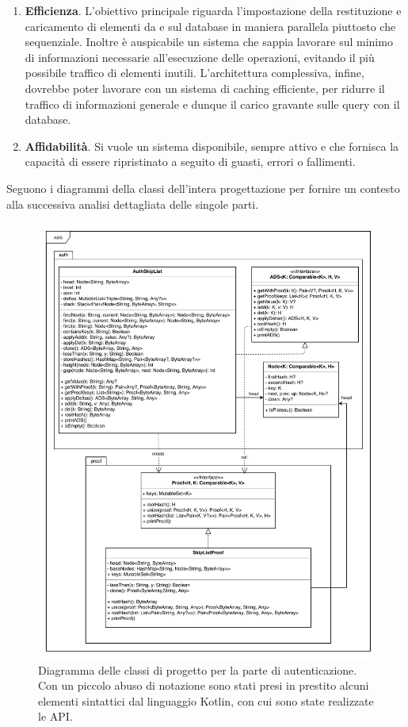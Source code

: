 	\begin{enumerate}
		\item \textbf{Efficienza}. L'obiettivo principale riguarda l'impostazione della restituzione e caricamento di elementi da e sul database in maniera parallela piuttosto che sequenziale. Inoltre è auspicabile un sistema che sappia lavorare sul minimo di informazioni necessarie all'esecuzione delle operazioni, evitando il più possibile traffico di elementi inutili. L'architettura complessiva, infine, dovrebbe poter lavorare con un sistema di caching efficiente, per ridurre il traffico di informazioni generale e dunque il carico gravante sulle query con il database.
		\item \textbf{Affidabilità}. Si vuole un sistema disponibile, sempre attivo e che fornisca la capacità di essere ripristinato a seguito di guasti, errori o fallimenti.
	\end{enumerate}

	Seguono i diagrammi della classi dell'intera progettazione per fornire un contesto alla successiva analisi dettagliata delle singole parti.

	\begin{figure}
		\centering
		\includegraphics[scale=0.65]{figure/Auth+Proof.pdf}
		\caption{Diagramma delle classi di progetto per la parte di autenticazione. Con un piccolo abuso di notazione sono stati presi in prestito alcuni elementi sintattici dal linguaggio Kotlin, con cui sono state realizzate le API.}\label{fig:authDCD}
	\end{figure}

